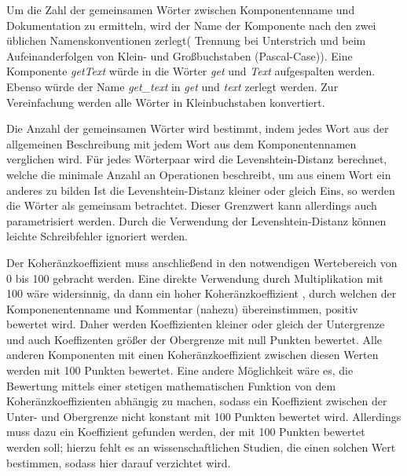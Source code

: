 Um die Zahl der  gemeinsamen Wörter zwischen Komponentenname und Dokumentation zu ermitteln, wird der Name der Komponente nach den zwei üblichen Namenskonventionen zerlegt( Trennung bei Unterstrich und beim Aufeinanderfolgen von Klein- und Großbuchstaben (Pascal-Case)). Eine Komponente \textit{getText} würde in die Wörter \textit{get} und \textit{Text} aufgespalten werden. Ebenso würde der Name \textit{get\_text} in  \textit{get} und \textit{text} zerlegt werden. Zur Vereinfachung werden alle Wörter in Kleinbuchstaben konvertiert. 

Die Anzahl der gemeinsamen Wörter wird bestimmt, indem jedes Wort aus der allgemeinen Beschreibung mit jedem Wort aus dem Komponentennamen verglichen wird. Für jedes Wörterpaar wird die Levenshtein-Distanz berechnet, welche die minimale Anzahl an Operationen beschreibt, um aus einem Wort ein anderes zu bilden \cite[S. 1091]{ANormalizedLevenshteinDistanceMetric} Ist  die Levenshtein-Distanz kleiner oder gleich Eins, so werden die Wörter als gemeinsam betrachtet. Dieser Grenzwert kann allerdings auch parametrisiert werden. Durch die Verwendung der Levenshtein-Distanz können leichte Schreibfehler ignoriert werden. 

Der Koheränzkoeffizient muss anschließend in den notwendigen Wertebereich von 0 bis 100 gebracht werden. Eine direkte Verwendung durch Multiplikation mit 100 wäre widersinnig, da dann ein hoher Koheränzkoeffizient , durch welchen der Komponenentenname und Kommentar (nahezu) übereinstimmen, positiv bewertet wird. Daher werden Koeffizienten kleiner oder gleich der Untergrenze und auch Koeffizenten größer der Obergrenze mit null Punkten bewertet. Alle anderen Komponenten mit einen Koheränzkoeffizient zwischen diesen Werten werden mit 100 Punkten bewertet. Eine andere Möglichkeit wäre es, die Bewertung mittels einer stetigen mathematischen Funktion von dem Koheränzkoeffizienten abhängig zu machen, sodass ein Koeffizient zwischen der Unter- und Obergrenze nicht konstant mit 100 Punkten bewertet wird. Allerdings muss dazu ein Koeffizient gefunden werden, der mit 100 Punkten bewertet werden soll; hierzu fehlt es an wissenschaftlichen Studien, die einen solchen Wert bestimmen, sodass hier darauf verzichtet wird. 

